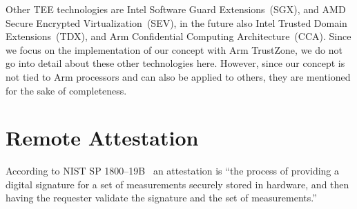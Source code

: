 Other \ac{TEE} technologies are Intel Software Guard Extensions~(SGX), and AMD Secure Encrypted Virtualization~(SEV), in the future also Intel Trusted Domain Extensions~(TDX), and Arm Confidential Computing Architecture~(CCA).
Since we focus on the implementation of our concept with Arm TrustZone, we do not go into detail about these other technologies here.
However, since our concept is not tied to Arm processors and can also be applied to others, they are mentioned for the sake of completeness.





\section{Remote Attestation}


According to NIST SP 1800--19B~\cite{Bartock2022} an attestation is ``the process of providing a digital signature for a set of measurements securely stored in hardware, and then having the requester validate the signature and the set of measurements.''





